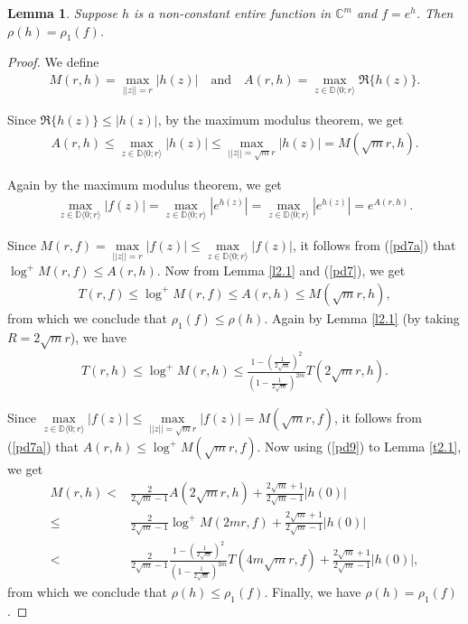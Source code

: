 \documentclass[11pt, reqno]{amsart}
\newtheorem{lem}{Lemma}[section]
\numberwithin{equation}{section}
\begin{document}
\begin{lem}\label{t2.2} Suppose $h$ is a non-constant entire function in $\mathbb{C}^m$ and $f=e^{h}$.  Then $\rho(h)=\rho_1(f)$.
\end{lem}
\begin{proof}
We define
\begin{align*}
M(r, h)=\max_{||z||=r} |h(z)|\quad \text{and}\quad
A(r, h)=\max\limits_{z\in \mathbb{D}\langle 0;r\rangle} \Re\{h(z)\}.
\end{align*}

Since $\Re\{h(z)\}\leq |h(z)|$, by the maximum modulus theorem, we get
\begin{align}\label{pd7} 
A(r, h)\leq \max\limits_{z\in \mathbb{D}\langle 0;r\rangle}|h(z)|\leq \max\limits_{||z||=\sqrt{m}r}|h(z)|=M(\sqrt{m}r,h).
\end{align}

Again by the maximum modulus theorem, we get
\begin{align}\label{pd7a}
\max_{z\in \mathbb{D}\langle 0;r\rangle} |f(z)|=\max_{z\in \mathbb{D}\langle 0;r\rangle} \left|e^{h(z)}\right|=\max_{z\in \mathbb{D}\langle 0;r\rangle} |e^{h(z)}|=e^{A(r,h)}.
 \end{align}
 
Since $M(r,f)=\max\limits_{||z||=r} |f(z)|\leq \max\limits_{z\in \mathbb{D}\langle 0;r\rangle}|f(z)|$, it follows from (\ref{pd7a}) that
$\log^+ M(r, f)\leq A(r, h)$. Now from Lemma \ref{l2.1} and (\ref{pd7}), we get
\begin{align*}
 T(r, f) \leq \log^+ M(r, f)\leq A(r, h) \leq M(\sqrt{m}r, h),
\end{align*}
from which we conclude that $\rho_1(f)\leq \rho(h)$.
Again by Lemma \ref{l2.1} (by taking $R=2\sqrt{m}r$), we have
\begin{align}\label{pd9} 
T(r, h) \leq \log^+ M(r, h)\leq \frac{1-\left(\frac{1}{2\sqrt{m}}\right)^2}{\left(1-\frac{1}{2\sqrt{m}}\right)^{2m}} T(2\sqrt{m}r, h).
\end{align}

Since $\max\limits_{z\in \mathbb{D}\langle 0;r\rangle}|f(z)|\leq \max\limits_{||z||=\sqrt{m}r} |f(z)|=M(\sqrt{m}r,f)$, it follows from (\ref{pd7a}) that $A(r, h)\leq \log^+ M(\sqrt{m}r, f)$.
Now using (\ref{pd9}) to Lemma \ref{t2.1}, we get
\begin{align*} M(r, h)<&\frac{2}{2\sqrt{m}-1}A(2\sqrt{m}r, h) +\frac{2\sqrt{m}+1}{2\sqrt{m}-1} |h(0)|\\\leq &\frac{2}{2\sqrt{m}-1}\log^+ M(2mr, f) + \frac{2\sqrt{m}+1}{2\sqrt{m}-1}|h(0)| \\
<& \frac{2}{2\sqrt{m}-1} \frac{1-\left(\frac{1}{2\sqrt{m}}\right)^2}{\left(1-\frac{1}{2\sqrt{m}}\right)^{2m}} T(4m\sqrt{m}r, f) +\frac{2\sqrt{m}+1}{2\sqrt{m}-1}|h(0)|,
\end{align*}
from which we conclude that $\rho(h)\leq \rho_1(f)$.
Finally, we have $\rho(h)=\rho_1(f)$.
\end{proof}
\end{document}
